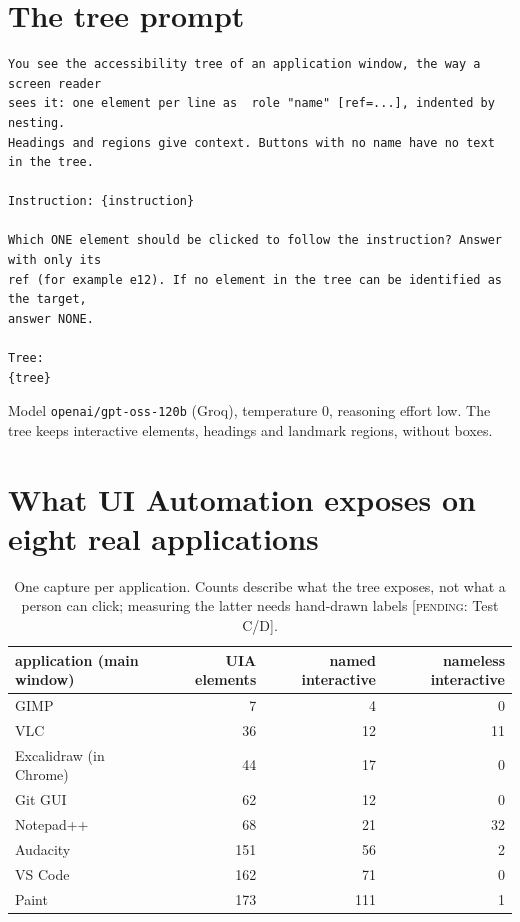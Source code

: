 \documentclass[11pt]{article}
\newcommand{\pending}[1]{\textcolor{red!70!black}{[\textsc{pending}: #1]}}
\begin{document}
\section{The tree prompt}
\begin{small}
\begin{verbatim}
You see the accessibility tree of an application window, the way a screen reader
sees it: one element per line as  role "name" [ref=...], indented by nesting.
Headings and regions give context. Buttons with no name have no text in the tree.

Instruction: {instruction}

Which ONE element should be clicked to follow the instruction? Answer with only its
ref (for example e12). If no element in the tree can be identified as the target,
answer NONE.

Tree:
{tree}
\end{verbatim}
\end{small}
Model \texttt{openai/gpt-oss-120b} (Groq), temperature 0, reasoning effort low. The tree keeps interactive
elements, headings and landmark regions, without boxes.

\section{What UI Automation exposes on eight real applications}
\label{app:exposure}
\begin{table}[H]
\centering\small
\begin{tabular}{lrrr}
\toprule
application (main window) & UIA elements & named interactive & nameless interactive \\
\midrule
GIMP & 7 & 4 & 0 \\
VLC & 36 & 12 & 11 \\
Excalidraw (in Chrome) & 44 & 17 & 0 \\
Git GUI & 62 & 12 & 0 \\
Notepad++ & 68 & 21 & 32 \\
Audacity & 151 & 56 & 2 \\
VS Code & 162 & 71 & 0 \\
Paint & 173 & 111 & 1 \\
\bottomrule
\end{tabular}
\caption{One capture per application. Counts describe what the tree exposes, not what a person can click;
measuring the latter needs hand-drawn labels \pending{Test C/D}.}
\end{table}
\end{document}

